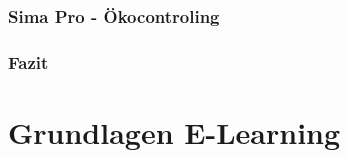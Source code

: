 \documentclass[a4paper, 12pt, twoside, BCOR=20mm, DIV=calc, abstracton, parskip=half*, toc=bibliography, toc=listof, headsepline, footsepline, headings=small, numbers=enddot]{scrreprt}
\begin{document}
\subsection{Sima Pro - Ökocontroling}

\subsection{Fazit}
%


\chapter{Grundlagen E-Learning}
\end{document}
